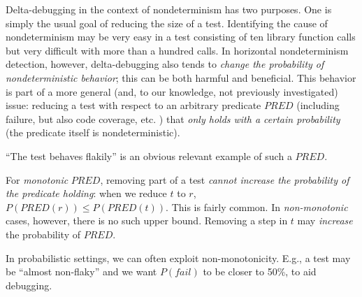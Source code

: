 Delta-debugging in the context of nondeterminism has two
purposes.  One is simply the usual goal of reducing the size of a
test.  Identifying the cause of nondeterminism may be very easy in a
test consisting of ten library function calls but very difficult with
more than a hundred calls.  In horizontal nondeterminism detection, however,
delta-debugging also tends to \emph{change the probability of
  nondeterministic behavior}; this can be both harmful and
beneficial.  This behavior is part of a more general (and, to our
knowledge, not previously investigated) issue: reducing a test with
respect to an arbitrary predicate $\mathit{PRED}$ (including failure,
but also code coverage, etc. \cite{icst2014,stvrcausereduce}) that \emph{only holds with a
certain probability} (the predicate itself is nondeterministic).

``The test behaves flakily'' is an obvious relevant example of such a $\mathit{PRED}$.

For \emph{monotonic} $\mathit{PRED}$, removing part of a test \emph{cannot
increase the probability of the predicate holding}: when we reduce $t$
to $r$, $P(\mathit{PRED}(r)) \leq P(\mathit{PRED}(t))$.  This is fairly
common.  In \emph{non-monotonic} cases,
however, there is no such upper bound.  Removing a step in $t$ may
\emph{increase} the probability of $\mathit{PRED}$.

In probabilistic
settings, we can often exploit non-monotonicity.  E.g., a test may be
``almost non-flaky'' and we want $P(\mathit{fail})$ to be closer to
50\%, to aid debugging.

